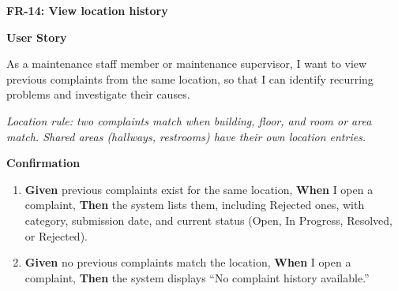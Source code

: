 \noindent\textbf{FR-14: View location history}\par\nopagebreak[4]\smallskip
\noindent\textbf{User Story}\par\nopagebreak[4]
\noindent As a maintenance staff member or maintenance supervisor, I want to view previous complaints from the same location, so that I can identify recurring problems and investigate their causes.\par\smallskip
\noindent\textit{Location rule: two complaints match when building, floor, and room or area match. Shared areas (hallways, restrooms) have their own location entries.}\par\smallskip
{\makeatletter
{}
\makeatother
\noindent\textbf{Confirmation}\par\nopagebreak[4]\vspace{-6pt}\nopagebreak[4]
\begin{enumerate}\setlength{\itemsep}{2pt}\setlength{\parsep}{0pt}\setlength{\topsep}{2pt}\setlength{\partopsep}{0pt}
  \item \textbf{Given} previous complaints exist for the same location, \textbf{When} I open a complaint, \textbf{Then} the system lists them, including Rejected ones, with category, submission date, and current status (Open, In Progress, Resolved, or Rejected).
  \item \textbf{Given} no previous complaints match the location, \textbf{When} I open a complaint, \textbf{Then} the system displays ``No complaint history available.''
\end{enumerate}}
\medskip
 
